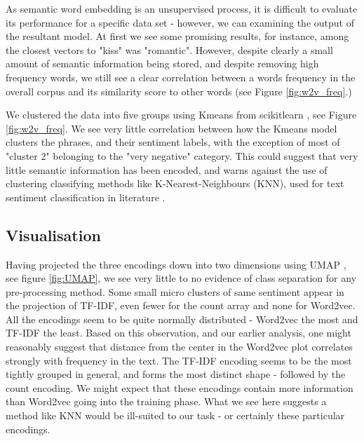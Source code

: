 \documentclass{article}
\begin{document}
As semantic word embedding is an unsupervised process, it is difficult to evaluate its performance for a specific data set - however, we can examining the output of the resultant model. At first we see some promising results, for instance, among the closest vectors to "kiss" was "romantic". However, despite clearly a small amount of semantic information being stored, and despite removing high frequency words, we still see a clear correlation between a words frequency in the overall corpus and its similarity score to other words (see Figure \ref{fig:w2v_freq}.) 

We clustered the data into five groups using Kmeans from scikitlearn \cite{scikit-learn}, see Figure \ref{fig:w2v_freq}. We see very little correlation between how the Kmeans model clusters the phrases, and their sentiment labels, with the exception of most of "cluster 2" belonging to the "very negative" category. This could suggest that very little semantic information has been encoded, and warns against the use of clustering classifying methods like K-Nearest-Neighbours (KNN), used for text sentiment classification in literature \cite{unknown31}\cite{chaudhary_2020}.

\subsection*{Visualisation}
Having projected the three encodings down into two dimensions using UMAP \cite{https://doi.org/10.48550/arxiv.1802.03426}, see figure \ref{fig:UMAP}, we see very little to no evidence of class separation for any pre-processing method. Some small micro clusters of same sentiment appear in the projection of TF-IDF, even fewer for the count array and none for Word2vec. All the encodings seem to be quite normally distributed - Word2vec the most and TF-IDF the least. Based on this observation, and our earlier analysis, one might reasonably suggest that distance from the center in the Word2vec plot correlates strongly with frequency in the text. The TF-IDF encoding seems to be the most tightly grouped in general, and forms the most distinct shape - followed by the count encoding. We might expect that these encodings contain more information than Word2vec going into the training phase. What we see here suggests a method like KNN would be ill-suited to our task - or certainly these particular encodings.
\end{document}
